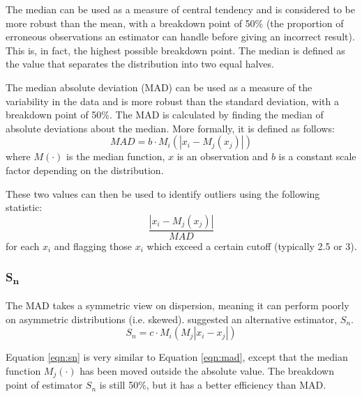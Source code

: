 \documentclass[11pt]{report}
\begin{document}
The median can be used as a measure of central tendency and is considered to be more robust than the mean, with a breakdown point of 50\% (the proportion of erroneous observations an estimator can handle before giving an incorrect result). This is, in fact, the highest possible breakdown point. The median is defined as the value that separates the distribution into two equal halves.

The median absolute deviation (MAD) can be used as a measure of the variability in the data and is more robust than the standard deviation, with a breakdown point of 50\%. The MAD is calculated by finding the median of absolute deviations about the median. More formally, it is defined as follows:
\begin{equation}
MAD = b \cdot M_i (| x_i - M_j (x_j) |)
\end{equation}
where $M(\cdot)$ is the median function, $x$ is an observation and $b$ is a constant scale factor depending on the distribution.


These two values can then be used to identify outliers using the following statistic:
\begin{equation} \label{eqn:mad}
\frac{| x_i - M_j(x_j) |}{MAD}
\end{equation}
for each $x_i$ and flagging those $x_i$ which exceed a certain cutoff (typically 2.5 or 3).


\subsubsection{S\textsubscript{n}} \label{sn}

The MAD takes a symmetric view on dispersion, meaning it can perform poorly on asymmetric distributions (i.e. skewed). \cite{rousseeuw1993alternatives} suggested an alternative estimator, $S_n$.
\begin{equation} \label{eqn:sn}
S_n = c \cdot M_i ( M_j | x_i - x_j | )
\end{equation}

Equation \ref{eqn:sn} is very similar to Equation \ref{eqn:mad}, except that the median function $M_j(\cdot)$ has been moved outside the absolute value. The breakdown point of estimator $S_n$ is still 50\%, but it has a better efficiency than MAD.
\end{document}

